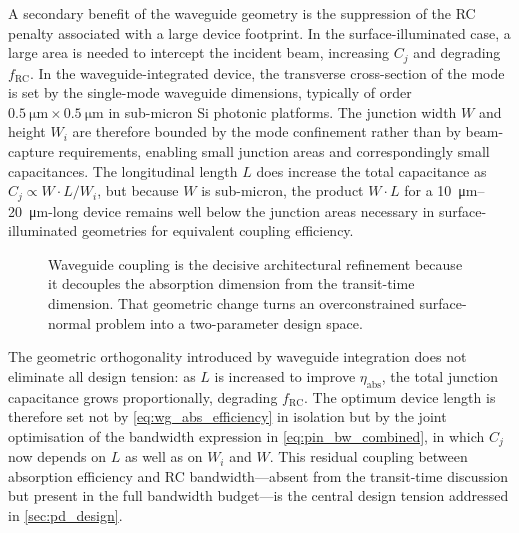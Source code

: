 A secondary benefit of the waveguide geometry is the suppression of the
RC penalty associated with a large device footprint. In the surface-illuminated
case, a large area is needed to intercept the incident beam, increasing $C_j$
and degrading $f_{\mathrm{RC}}$. In the waveguide-integrated device, the
transverse cross-section of the mode is set by the single-mode waveguide
dimensions, typically of order $\SI{0.5}{\micro\metre}\times\SI{0.5}{\micro\metre}$
in sub-micron Si photonic platforms. The junction width $W$ and height $W_i$
are therefore bounded by the mode confinement rather than by beam-capture
requirements, enabling small junction areas and correspondingly small
capacitances. The longitudinal length $L$ does increase the total capacitance
as $C_j\propto W\cdot L/W_i$, but because $W$ is sub-micron, the product
$W\cdot L$ for a \SI{10}{\micro\metre}--\SI{20}{\micro\metre}-long device
remains well below the junction areas necessary in surface-illuminated
geometries for equivalent coupling efficiency.

\begin{figure}[H]
    \centering
    \caption{Waveguide coupling is the decisive architectural refinement because
    it decouples the absorption dimension from the transit-time dimension. That
    geometric change turns an overconstrained surface-normal problem into a
    two-parameter design space.}
    \label{fig:wg_vs_sni}
\end{figure}

\noindent The geometric orthogonality introduced by waveguide integration
does not eliminate all design tension: as $L$ is increased to improve
$\eta_{\mathrm{abs}}$, the total junction capacitance grows proportionally,
degrading $f_{\mathrm{RC}}$. The optimum device length is therefore set not
by \cref{eq:wg_abs_efficiency} in isolation but by the joint optimisation of
the bandwidth expression in \cref{eq:pin_bw_combined}, in which $C_j$ now
depends on $L$ as well as on $W_i$ and $W$. This residual coupling between
absorption efficiency and RC bandwidth---absent from the transit-time
discussion but present in the full bandwidth budget---is the central
design tension addressed in \cref{sec:pd_design}.

